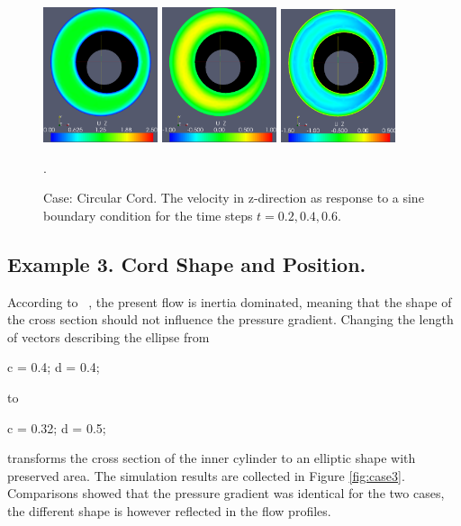 \begin{figure}\begin{center}
\includegraphics[width=0.3\textwidth]{chapters/hentschel/eps/sin_sysmax_nmb2.eps}
\includegraphics[width=0.3\textwidth]{chapters/hentschel/eps/sin_sysdia_nmb4.eps}
\includegraphics[width=0.3\textwidth]{chapters/hentschel/eps/sin_diamin_nmb6.eps}
\caption{Case: Circular Cord. The velocity in z-direction as response to a sine boundary condition for the time steps $t=0.2, 0.4, 0.6$.}
\label{fig:case2}. 
\end{center}\end{figure}





\subsection{Example 3. Cord Shape and Position.} 

According to ~\cite{Loth2001,Alperin2006}, the present flow is inertia dominated, meaning that the shape of the cross section should not influence the pressure gradient. Changing the length of vectors describing the ellipse from
\begin{code}
c = 0.4;
d = 0.4;
\end{code}
to
\begin{code}
c = 0.32;
d = 0.5;
\end{code}
transforms the cross section of the inner cylinder to an elliptic shape with preserved area. The simulation results are collected in Figure \ref{fig:case3}. Comparisons showed that the pressure gradient was identical for the two cases, the different shape is however reflected in the flow profiles.



